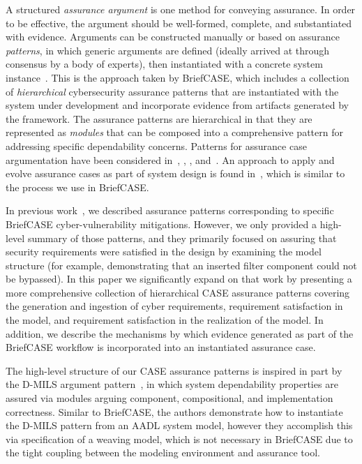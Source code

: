 A structured \textit{assurance argument} is one method for conveying assurance.
In order to be effective, the argument should be well-formed, complete, and substantiated with evidence.    
Arguments can be constructed manually or based on assurance \textit{patterns}, in which generic arguments are defined (ideally arrived at through consensus by a body of experts), then instantiated with a concrete system instance~\cite{Kelly97:patterns}.  This is the approach taken by BriefCASE, which includes a collection of \textit{hierarchical} cybersecurity assurance patterns that are instantiated with the system under development and incorporate evidence from artifacts generated by the framework.  The assurance patterns are hierarchical in that they are represented as \textit{modules} that can be composed into a comprehensive pattern for addressing specific dependability concerns.
%
Patterns for assurance case argumentation have been considered in~\cite{Denney13:pattern}, \cite{Hawkins11:pattern}, \cite{Kelly97:patterns}, and~\cite{Sun11:pattern}. An approach to apply and evolve assurance cases as part of system design is found in~\cite{Graydon07:dev}, which is similar to the process we use in BriefCASE.

In previous work~\cite{resolute-destion}, we described assurance patterns corresponding to specific BriefCASE cyber-vulnerability mitigations.  However, we only provided a high-level summary of those patterns, and they primarily focused on assuring that security requirements were satisfied in the design by examining the model structure (for example, demonstrating that an inserted filter component could not be bypassed).
%
In this paper we significantly expand on that work by presenting a more comprehensive collection of hierarchical CASE assurance patterns covering the generation and ingestion of cyber requirements, requirement satisfaction in the model, and requirement satisfaction in the realization of the model.  In addition, we describe the mechanisms by which evidence generated as part of the BriefCASE workflow is incorporated into an instantiated assurance case.

The high-level structure of our CASE assurance patterns is inspired in part by the D-MILS argument pattern~\cite{dmils}, in which system dependability properties are assured via modules arguing component, compositional, and implementation correctness.  Similar to BriefCASE, the authors demonstrate how to instantiate the D-MILS pattern from an AADL system model, however they accomplish this via specification of a weaving model, which is not necessary in BriefCASE due to the tight coupling between the modeling environment and assurance tool.

